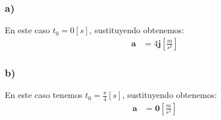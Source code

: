 \documentclass{article}
\begin{document}
\begin{tcolorbox}[breakable]
    \subsubsection*{a)}
    En este caso $t_0 = 0[s]$, sustituyendo obtenemos:
    \begin{align*}
        \bm{a} &= 4\bm{j} \left[ \frac{m}{s^2} \right]
    \end{align*}
    \subsubsection*{b)}
    En este caso tenemos $t_0 = \frac{\pi}{4}[s]$, sustituyendo obtenemos:
    \begin{align*}
        \bm{a} &= \bm{0} \left[ \frac{m}{s^2} \right]
    \end{align*}
\end{tcolorbox}
\end{document}
